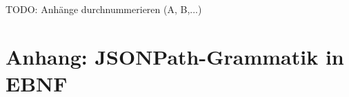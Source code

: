 \documentclass[oneside]{ausarbeitung}
\begin{document}
	
	
	TODO: Anhänge durchnummerieren (A, B,...)
	
	\chapter*{Anhang: JSONPath-Grammatik in EBNF}
	\label{anhang_ebnf_gram}
	
	
	
	
\end{document}

